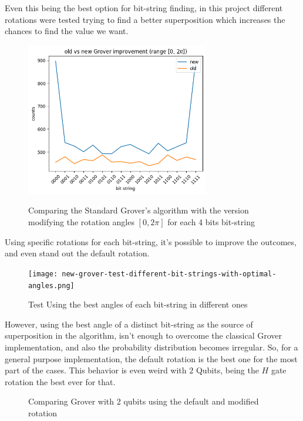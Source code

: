 \documentclass{article}
\begin{document}
Even this being the best option for bit-string finding, in this project different rotations were tested trying to find a better superposition which increases the chances to find the value we want.

\begin{figure}
	\caption{Comparing the Standard Grover's algorithm with the version modifying the rotation angles $[0, 2\pi]$ for each 4 bits bit-string}
	\includegraphics[width=8cm]{improvement-grover-algorithm-4bits-0-to-2pi.png}
	\label{fig:best-angle-grover}
\end{figure}

\newpage

Using specific rotations for each bit-string, it's possible to improve the outcomes, and even stand out the default rotation.

\begin{figure}[h]
	\centering
	\texttt{[image: new-grover-test-different-bit-strings-with-optimal-angles.png]}
	\caption{Test Using the best angles of each bit-string in different ones}
	\label{fig:best-angles-diff-bit-strings-grover}
\end{figure}

However, using the best angle of a distinct bit-string as the source of superposition in the algorithm, isn't enough to overcome the classical Grover implementation, and also the probability distribution becomes irregular. So, for a general purpose implementation, the default rotation is the best one for the most part of the cases. This behavior is even weird with $2$ Qubits, being the $H$ gate rotation the best ever for that.


\begin{figure}[h]
	\centering
	\caption{Comparing Grover with 2 qubits using the default and modified rotation}
	\label{fig:comparing-grover-2-qubits}
\end{figure}
\end{document}
